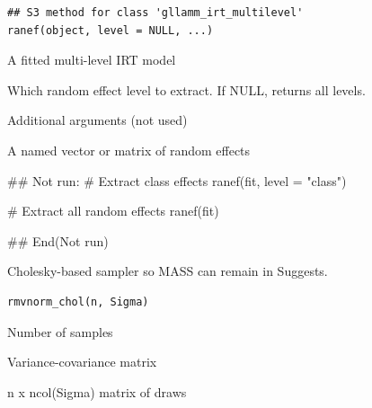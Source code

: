 \documentclass[a4paper]{book}
\begin{document}
%
\begin{Usage}
\begin{verbatim}
## S3 method for class 'gllamm_irt_multilevel'
ranef(object, level = NULL, ...)
\end{verbatim}
\end{Usage}
%
\begin{Arguments}
\begin{ldescription}
\item[\code{object}] A fitted multi-level IRT model

\item[\code{level}] Which random effect level to extract. If NULL, returns all levels.

\item[\code{...}] Additional arguments (not used)
\end{ldescription}
\end{Arguments}
%
\begin{Value}
A named vector or matrix of random effects
\end{Value}
%
\begin{Examples}
\begin{ExampleCode}
## Not run: 
# Extract class effects
ranef(fit, level = "class")

# Extract all random effects
ranef(fit)

## End(Not run)

\end{ExampleCode}
\end{Examples}
%
\begin{Description}
Cholesky-based sampler so MASS can remain in Suggests.
\end{Description}
%
\begin{Usage}
\begin{verbatim}
rmvnorm_chol(n, Sigma)
\end{verbatim}
\end{Usage}
%
\begin{Arguments}
\begin{ldescription}
\item[\code{n}] Number of samples

\item[\code{Sigma}] Variance-covariance matrix
\end{ldescription}
\end{Arguments}
%
\begin{Value}
n x ncol(Sigma) matrix of draws
\end{Value}
\end{document}
